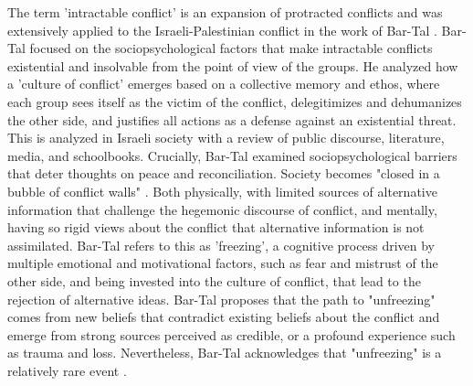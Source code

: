 \documentclass[dissertation,math,vertlayout,pdfa,colorlinks,nologo]{aaltoseries}
\begin{document}
The term 'intractable conflict' \cite{kriesbergIntractableConflicts1993} is an expansion of protracted conflicts and was extensively applied to the Israeli-Palestinian conflict in the work of Bar-Tal \cite{bar-talIntractableConflictsSociopsychological2013}. Bar-Tal focused on the sociopsychological factors that make intractable conflicts existential and insolvable from the point of view of the groups. He analyzed how a 'culture of conflict' emerges based on a collective memory and ethos, where each group sees itself as the victim of the conflict, delegitimizes and dehumanizes the other side, and justifies all actions as a defense against an existential threat. This is analyzed in Israeli society with a review of public discourse, literature, media, and schoolbooks. Crucially, Bar-Tal examined sociopsychological barriers that deter thoughts on peace and reconciliation. Society becomes "closed in a bubble of conflict walls" \cite[p. 281]{bar-talIntractableConflictsSociopsychological2013}. Both physically, with limited sources of alternative information that challenge the hegemonic discourse of conflict, and mentally, having so rigid views about the conflict that alternative information is not assimilated. Bar-Tal refers to this as 'freezing', a cognitive process driven by multiple emotional and motivational factors, such as fear and mistrust of the other side, and being invested into the culture of conflict, that lead to the rejection of alternative ideas. Bar-Tal proposes that the path to "unfreezing" comes from new beliefs that contradict existing beliefs about the conflict and emerge from strong sources perceived as credible, or a profound experience such as trauma and loss. Nevertheless, Bar-Tal acknowledges that "unfreezing" is a relatively rare event \cite[p. 289]{bar-talIntractableConflictsSociopsychological2013}. 
\end{document}
